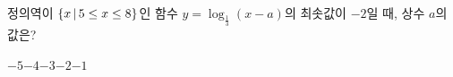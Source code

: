정의역이 $\{x\mkern3mu |\mkern3mu 5\le x\le 8\}$인 함수 $y=\log_{\frac{1}{3}} (x-a)$의 최솟값이 $-2$일 때, 상수 $a$의 값은?
\begin{choices32}{$-5$}{$-4$}{$-3$}{$-2$}{$-1$}\end{choices32}
